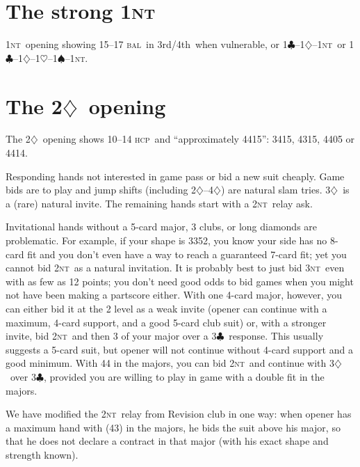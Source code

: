 \documentclass{report}
\newcommand{\tf}{3rd/4th}
\newcommand{\hcp}{\textsc{hcp}}
\newcommand{\bal}{\textsc{bal}}
\renewcommand{\c}{\ensuremath{\clubsuit}}
\renewcommand{\d}{\ensuremath{\diamondsuit}}
\newcommand{\h}{\ensuremath{\heartsuit}}
\newcommand{\s}{\ensuremath{\spadesuit}}
\newcommand{\nt}{\textsc{nt}}
\newcommand{\+}{\ensuremath{^+}}
\begin{document}
\chapter{The strong 1\nt}
1\nt\ opening showing 15--17 \bal\ in \tf\ when vulnerable, or
1\c--1\d--1\nt\ or 1\c--1\d--1\h--1\s--1\nt.

\chapter{The 2\d\ opening}

The 2\d\ opening shows 10--14 \hcp\ and ``approximately 4415'': 3415,
4315, 4405 or 4414.

Responding hands not interested in game pass or bid a new suit
cheaply.  Game bids are to play and jump shifts (including 2\d--4\d)
are natural slam tries.  3\d\ is a (rare) natural invite.  The
remaining hands start with a 2\nt\ relay ask.

Invitational hands without a 5-card major, 3 clubs, or long diamonds
are problematic.  For example, if your shape is 3352, you know your
side has no 8-card fit and you don't even have a way to reach a
guaranteed 7-card fit; yet you cannot bid 2\nt\ as a natural
invitation.  It is probably best to just bid 3\nt\ even with as few as
12 points; you don't need good odds to bid games when you might not
have been making a partscore either.  With one 4-card major, however,
you can either bid it at the 2 level as a weak invite (opener can
continue with a maximum, 4-card support, and a good 5-card club suit)
or, with a stronger invite, bid 2\nt\ and then 3 of your major over a
3\c\ response.  This usually suggests a 5-card suit, but opener will
not continue without 4-card support and a good minimum.  With 44 in
the majors, you can bid 2\nt\ and continue with 3\d\ over 3\c,
provided you are willing to play in game with a double fit in the
majors.

We have modified the 2\nt\ relay from Revision club in one way: when
opener has a maximum hand with (43) in the majors, he bids the suit
above his major, so that he does not declare a contract in that major
(with his exact shape and strength known).
\end{document}
